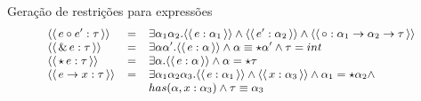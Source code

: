 \documentclass{beamer}
\newcommand{\constr}[1]{\ensuremath{\langle\langle\,#1\,\rangle\rangle}}
\begin{document}
   \begin{frame}{Geração de restrições para expressões}
       \[
            \small{
                 \begin{array}{lcl}
                     \constr{e \circ e' : \tau} & = & \exists
                                                      \alpha_1\alpha_2.\constr{e
                                                      :\alpha_1} \land
                                                      \constr{e' :
                                                      \alpha_2} \land
                                                      \constr{\circ :
                                                      \alpha_1\to\alpha_2\to\tau}\\
                     \constr{\&\,e : \tau} & = & \exists \alpha
                                                 \alpha'. \constr{e :
                                                 \alpha} \land
                                                 \alpha \equiv \star \alpha'
                                                 \land \tau = int\\
                     \constr{\star\,e : \tau} & = & \exists
                                                    \alpha. \constr{e
                                                    : \alpha} \land
                                                    \alpha = \star \tau\\
                     \constr{e\to x : \tau} & = & \exists
                                                  \alpha_1\alpha_2\alpha_3. \constr{e
                                                  :\alpha_1} \land
                                                  \constr{x :
                                                  \alpha_3} \land
                                                  \alpha_1 = \star\alpha_2
                                                  \land\\
                          & & has(\alpha,x : \alpha_3) \land \tau
                              \equiv \alpha_3\\
                 \end{array}}
       \]
   \end{frame}
\end{document}
